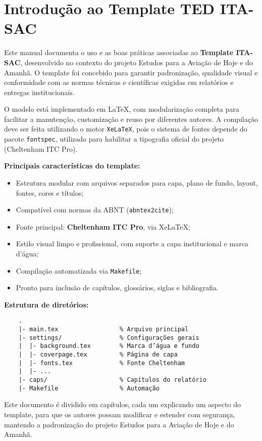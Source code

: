 \chapter{Introdução ao Template TED ITA-SAC}

Este manual documenta o uso e as boas práticas associadas ao \textbf{Template ITA-SAC}, desenvolvido no contexto do projeto Estudos para a Aviação de Hoje e do Amanhã. O template foi concebido para garantir padronização, qualidade visual e conformidade com as normas técnicas e científicas exigidas em relatórios e entregas institucionais.

O modelo está implementado em \LaTeX, com modularização completa para facilitar a manutenção, customização e reuso por diferentes autores. A compilação deve ser feita utilizando o motor \texttt{XeLaTeX}, pois o sistema de fontes depende do pacote \texttt{fontspec}, utilizado para habilitar a tipografia oficial do projeto (Cheltenham ITC Pro).

\vspace{1em}

\textbf{Principais características do template:}
\begin{itemize}
    \item Estrutura modular com arquivos separados para capa, plano de fundo, layout, fontes, cores e títulos;
    \item Compatível com normas da ABNT (\texttt{abntex2cite});
    \item Fonte principal: \textbf{Cheltenham ITC Pro}, via XeLaTeX;
    \item Estilo visual limpo e profissional, com suporte a capa institucional e marca d’água;
    \item Compilação automatizada via \texttt{Makefile};
    \item Pronto para inclusão de capítulos, glossários, siglas e bibliografia.
\end{itemize}

\vspace{1em}

\textbf{Estrutura de diretórios:}

\begin{verbatim}
	.
	|- main.tex                 % Arquivo principal
	|- settings/                % Configurações gerais
	|  |- background.tex        % Marca d’água e fundo
	|  |- coverpage.tex         % Página de capa
	|  |- fonts.tex             % Fonte Cheltenham
	|  |- ...
	|- caps/                    % Capítulos do relatório
	|- Makefile                 % Automação
\end{verbatim}

Este documento é dividido em capítulos, cada um explicando um aspecto do template, para que os autores possam modificar e estender com segurança, mantendo a padronização do projeto Estudos para a Aviação de Hoje e do Amanhã.



